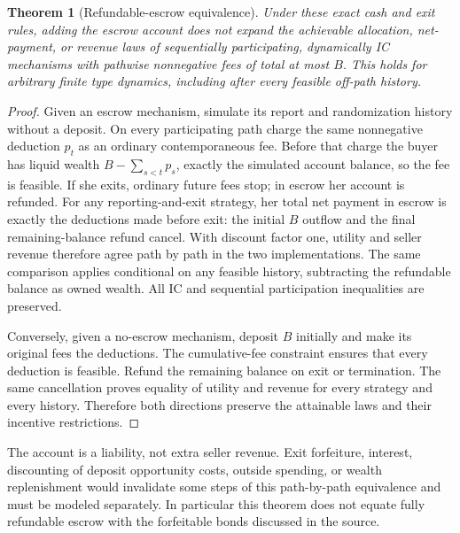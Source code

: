 \documentclass[11pt]{article}
\newtheorem{theorem}{Theorem}
\theoremstyle{remark}
\begin{document}
\begin{theorem}[Refundable-escrow equivalence]\label{escrow}
Under these exact cash and exit rules, adding the escrow account does
not expand the achievable allocation, net-payment, or revenue laws of
sequentially participating, dynamically IC mechanisms with pathwise
nonnegative fees of total at most $B$. This holds for arbitrary finite
type dynamics, including after every feasible off-path history.
\end{theorem}
\begin{proof}
Given an escrow mechanism, simulate its report and randomization history
without a deposit. On every participating path charge the same
nonnegative deduction $p_t$ as an ordinary contemporaneous fee. Before
that charge the buyer has liquid wealth
$B-\sum_{s<t}p_s$, exactly the simulated account balance, so the fee is
feasible. If she exits, ordinary future fees stop; in escrow her account
is refunded. For any reporting-and-exit strategy, her total net payment
in escrow is exactly the deductions made before exit: the initial $B$
outflow and the final remaining-balance refund cancel. With discount
factor one, utility and seller revenue therefore agree path by path in
the two implementations. The same comparison applies conditional on
any feasible history, subtracting the refundable balance as owned
wealth. All IC and sequential participation inequalities are preserved.

Conversely, given a no-escrow mechanism, deposit $B$ initially and make
its original fees the deductions. The cumulative-fee constraint ensures
that every deduction is feasible. Refund the remaining balance on exit
or termination. The same cancellation proves equality of utility and
revenue for every strategy and every history. Therefore both directions
preserve the attainable laws and their incentive restrictions.
\end{proof}

The account is a liability, not extra seller revenue. Exit forfeiture,
interest, discounting of deposit opportunity costs, outside spending,
or wealth replenishment would invalidate some steps of this
path-by-path equivalence and must be modeled separately. In particular
this theorem does not equate fully refundable escrow with the
forfeitable bonds discussed in the source.
\end{document}
